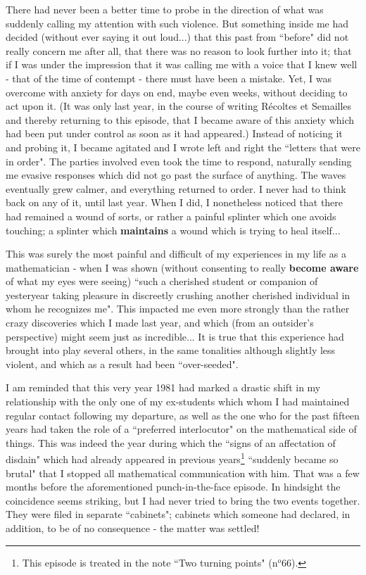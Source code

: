 There had never been a better time to probe in the direction of what was suddenly calling my attention with such violence. But something inside me had decided (without ever saying it out loud...) that this past from ``before" did not really concern me after all, that there was no reason to look further into it; that if I was under the impression that it was calling me with a voice that I knew well - that of the time of contempt - there must have been a mistake. Yet, I was overcome with anxiety for days on end, maybe even weeks, without deciding to act upon it. (It was only last year, in the course of writing R\'ecoltes et Semailles and thereby returning to this episode, that I became aware of this anxiety which had been put under control as soon as it had appeared.) Instead of noticing it and probing it, I became agitated and I wrote left and right the ``letters that were in order". The parties involved even took the time to respond, naturally sending me evasive responses which did not go past the surface of anything. The waves eventually grew calmer, and everything returned to order. I never had to think back on any of it, until last year. When I did, I nonetheless noticed that there had remained a wound of sorts, or rather a painful splinter which one avoids touching; a splinter which \textbf{maintains} a wound which is trying to heal itself... 

This was surely the most painful and difficult of my experiences in my life as a mathematician - when I was shown (without consenting to really \textbf{become aware} of what my eyes were seeing) ``such a cherished student or companion of yesteryear taking pleasure in discreetly crushing another cherished individual in whom he recognizes me". This impacted me even more strongly than the rather crazy discoveries which I made last year, and which (from an outsider's perspective) might seem just as incredible... It is true that this experience had brought into play several others, in the same tonalities although slightly less violent, and which as a result had been ``over-seeded".  

I am reminded that this very year 1981 had marked a drastic shift in my relationship with the only one of my ex-students which whom I had maintained regular contact following my departure, as well as the one who for the past fifteen years had taken the role of a ``preferred interlocutor" on the mathematical side of things. This was indeed the year during which the ``signs of an affectation of disdain" which had already appeared in previous years\footnote{This episode is treated in the note ``Two turning points" (n$^o$66).}
``suddenly became so brutal" that I stopped all mathematical communication with him. That was a few months before the aforementioned punch-in-the-face episode. In hindsight the coincidence seems striking, but I had never tried to bring the two events together. They were filed in separate ``cabinets"; cabinets which someone had declared, in addition, to be of no consequence - the matter was settled!

